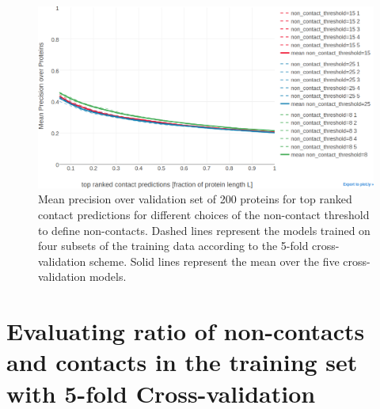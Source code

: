 \documentclass[12pt,a4paper,twoside]{book}
\theoremstyle{definition}
\theoremstyle{definition}
\theoremstyle{remark}
\begin{document}
\begin{figure}

{\centering \includegraphics[width=0.9\linewidth]{img/random_forest_contact_prior/cross_validation/precision_vs_rank_cv_on_test_random_forest_nestimators1000_maxfeatureslog2_maxdepth10_minsamplesleaf100_noncontactthr} 

}

\caption{Mean precision over
validation set of 200 proteins for top ranked contact predictions for
different choices of the non-contact threshold to define non-contacts.
Dashed lines represent the models trained on four subsets of the
training data according to the 5-fold cross-validation scheme. Solid
lines represent the mean over the five cross-validation models.}\label{fig:random-forest-noncontactthr-cv}
\end{figure}

\section{Evaluating ratio of non-contacts and contacts in the training
set with 5-fold Cross-validation}\label{rf-ratio-noncontacts}
\end{document}

